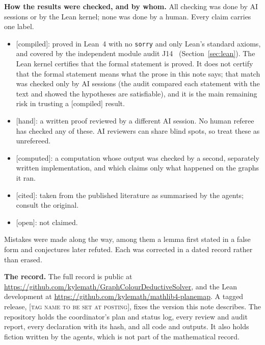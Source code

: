 \documentclass[11pt]{article}
\theoremstyle{definition}
\newcommand{\lab}[1]{\textsf{[#1]}}
\begin{document}
{\textbf{How the results were checked, and by whom.} All checking was done by AI sessions or by the Lean kernel; none was done by a human. Every claim carries one label.
\begin{itemize}
\item \lab{compiled}: proved in Lean~4 with no \texttt{sorry} and only Lean's standard axioms, and covered by the independent module audit J14~\cite{audit} (Section~\ref{sec:lean}). The Lean kernel certifies that the formal statement is proved. It does not certify that the formal statement means what the prose in this note says; that match was checked only by AI sessions (the audit compared each statement with the text and showed the hypotheses are satisfiable), and it is the main remaining risk in trusting a \lab{compiled} result.
\item \lab{hand}: a written proof reviewed by a different AI session. No human referee has checked any of these. AI reviewers can share blind spots, so treat these as unrefereed.
\item \lab{computed}: a computation whose output was checked by a second, separately written implementation, and which claims only what happened on the graphs it ran.
\item \lab{cited}: taken from the published literature as summarised by the agents; consult the original.
\item \lab{open}: not claimed.
\end{itemize}
Mistakes were made along the way, among them a lemma first stated in a false form and conjectures later refuted. Each was corrected in a dated record rather than erased.

\textbf{The record.} The full record is public at \url{https://github.com/kylemath/GraphColourDeductiveSolver}, and the Lean development at \url{https://github.com/kylemath/mathlib4-planemap}. A tagged release, [\textsc{tag name to be set at posting}], fixes the version this note describes. The repository holds the coordinator's plan and status log, every review and audit report, every declaration with its hash, and all code and outputs. It also holds fiction written by the agents, which is not part of the mathematical record.

}
\end{document}
